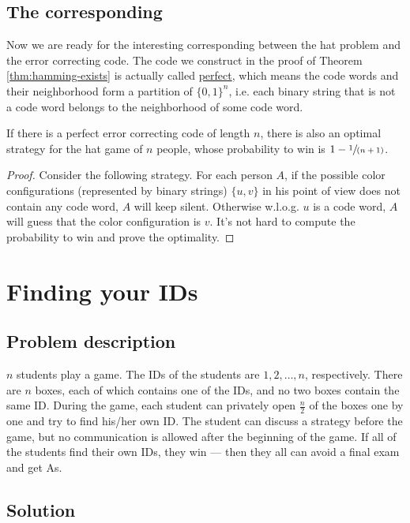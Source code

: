 \documentclass{scribe}
\begin{document}
\subsection{The corresponding}
\label{sec:corresponding}

Now we are ready for the interesting corresponding between the hat problem and the error correcting code. The code we construct in the proof of Theorem \ref{thm:hamming-exists} is actually called \ul{perfect}, which means the code words and their neighborhood form a partition of $\{0, 1\}^n$, i.e. each binary string that is not a code word belongs to the neighborhood of some code word.

\begin{theorem}
  If there is a perfect error correcting code of length $n$, there is also an optimal strategy for the hat game of $n$ people, whose probability to win is $1-\sfrac{1}{(n+1)}$. 
\end{theorem}

\begin{proof}
  Consider the following strategy. For each person $A$, if the possible color configurations (represented by binary strings) $\{u, v\}$ in his point of view does not contain any code word, $A$ will keep silent. Otherwise w.l.o.g. $u$ is a code word, $A$ will guess that the color configuration is $v$. It's not hard to compute the probability to win and prove the optimality.  
\end{proof}

\section{Finding your IDs}

\subsection{Problem description}

$n$ students play a game. The IDs of the students are $1,2,\dots,n$, respectively. There are $n$ boxes, each of which contains one of the IDs, and no two boxes contain the same ID. During the game, each student can privately open $\frac{n}{2}$ of the boxes one by one and try to find his/her own ID. The student can discuss a strategy before the game, but no communication is allowed after the beginning of the game. If all of the students find their own IDs, they win --- then they all can avoid a final exam and get As.

\subsection{Solution}
\end{document}
